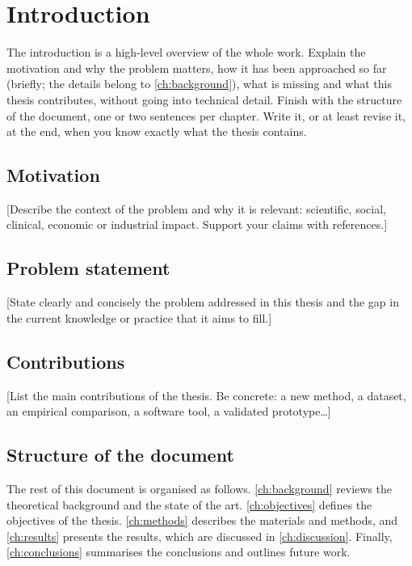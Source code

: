 \chapter{Introduction}\label{ch:introduction}

\begin{guidance}
The introduction is a high-level overview of the whole work. Explain the motivation and
why the problem matters, how it has been approached so far (briefly; the details belong to
\autoref{ch:background}), what is missing and what this thesis contributes, without going into
technical detail. Finish with the structure of the document, one or two sentences per
chapter. Write it, or at least revise it, at the end, when you know exactly what the thesis
contains.
\end{guidance}

\section{Motivation}\label{sec:motivation}

[Describe the context of the problem and why it is relevant: scientific, social, clinical,
economic or industrial impact. Support your claims with references.]

\section{Problem statement}\label{sec:problem}

[State clearly and concisely the problem addressed in this thesis and the gap in the
current knowledge or practice that it aims to fill.]

\section{Contributions}\label{sec:contributions}

[List the main contributions of the thesis. Be concrete: a new method, a dataset, an
empirical comparison, a software tool, a validated prototype\dots]

\section{Structure of the document}\label{sec:structure}

The rest of this document is organised as follows. \autoref{ch:background} reviews the
theoretical background and the state of the art. \autoref{ch:objectives} defines the
objectives of the thesis. \autoref{ch:methods} describes the materials and methods, and
\autoref{ch:results} presents the results, which are discussed in \autoref{ch:discussion}.
Finally, \autoref{ch:conclusions} summarises the conclusions and outlines future work.
